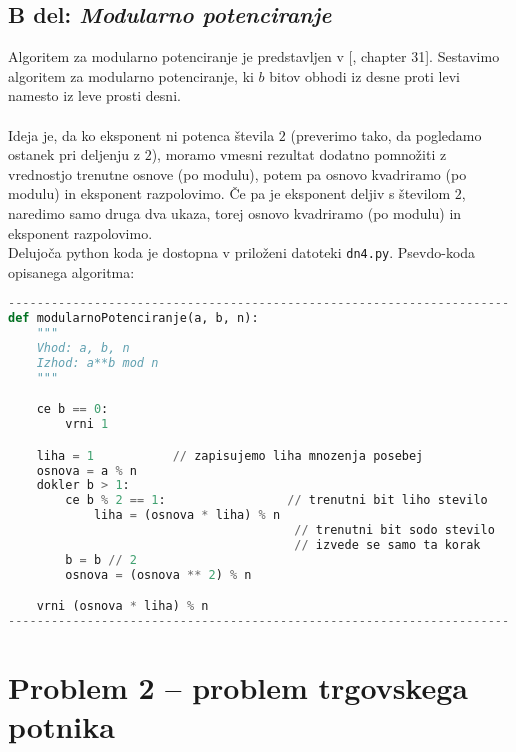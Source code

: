 \documentclass[a4paper,11pt]{article}
\begin{document}
\subsection*{B del: \textit{Modularno potenciranje}}
Algoritem za modularno potenciranje je predstavljen v [\cite{vir}, chapter 31]. Sestavimo algoritem za modularno potenciranje, ki $b$ bitov obhodi iz desne proti levi namesto iz leve prosti desni.
\\
\\
Ideja je, da ko eksponent ni potenca števila $2$ (preverimo tako, da pogledamo ostanek pri deljenju z $2$), 
moramo vmesni rezultat dodatno pomnožiti z vrednostjo trenutne osnove (po modulu), potem pa osnovo kvadriramo (po modulu) in eksponent razpolovimo. 
Če pa je eksponent deljiv s številom $2$, naredimo samo druga dva ukaza, torej osnovo kvadriramo (po modulu) in eksponent razpolovimo.
\\
Delujoča python koda je dostopna v priloženi datoteki \texttt{dn4.py}. Psevdo-koda opisanega algoritma:

\begin{lstlisting}[language = Python]
----------------------------------------------------------------------
def modularnoPotenciranje(a, b, n):
    """
    Vhod: a, b, n
    Izhod: a**b mod n
    """

    ce b == 0:
        vrni 1

    liha = 1           // zapisujemo liha mnozenja posebej
    osnova = a % n      
    dokler b > 1:
        ce b % 2 == 1:                 // trenutni bit liho stevilo
            liha = (osnova * liha) % n                         
                                        // trenutni bit sodo stevilo 
                                        // izvede se samo ta korak
        b = b // 2             
        osnova = (osnova ** 2) % n

    vrni (osnova * liha) % n
----------------------------------------------------------------------

\end{lstlisting}


\section*{Problem 2 -- problem trgovskega potnika}
\end{document}
